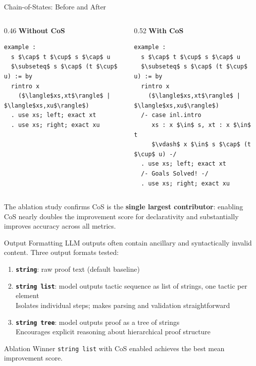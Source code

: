 \documentclass{beamer}
\begin{document}
\begin{frame}[fragile]{Chain-of-States: Before and After}
\begin{columns}[T]
\begin{column}{0.46\textwidth}
\textbf{Without CoS}
\begin{lstlisting}[basicstyle=\footnotesize\ttfamily]
example :
  s $\cap$ t $\cup$ s $\cap$ u
  $\subseteq$ s $\cap$ (t $\cup$ u) := by
  rintro x
    ($\langle$xs,xt$\rangle$ | $\langle$xs,xu$\rangle$)
  . use xs; left; exact xt
  . use xs; right; exact xu
\end{lstlisting}
\end{column}
\begin{column}{0.52\textwidth}
\textbf{With CoS}
\begin{lstlisting}[basicstyle=\footnotesize\ttfamily]
example :
  s $\cap$ t $\cup$ s $\cap$ u
  $\subseteq$ s $\cap$ (t $\cup$ u) := by
  rintro x
    ($\langle$xs,xt$\rangle$ | $\langle$xs,xu$\rangle$)
  /- case inl.intro
     xs : x $\in$ s, xt : x $\in$ t
     $\vdash$ x $\in$ s $\cap$ (t $\cup$ u) -/
  . use xs; left; exact xt
  /- Goals Solved! -/
  . use xs; right; exact xu
\end{lstlisting}
\end{column}
\end{columns}
\vspace{0.4em}
\small The ablation study confirms CoS is the \textbf{single largest contributor}: enabling CoS nearly doubles the improvement score for declarativity and substantially improves accuracy across all metrics.
\end{frame}

\begin{frame}{Output Formatting}
\vspace{0.3em}
LLM outputs often contain ancillary and syntactically invalid content. Three output formats tested:
\vspace{0.3em}
\begin{enumerate}\setlength{\itemsep}{7pt}
  \item \textbf{\texttt{string}}: raw proof text (default baseline)
  \item \textbf{\texttt{string list}}: model outputs tactic sequence as list of strings, one tactic per element\\
    \small Isolates individual steps; makes parsing and validation straightforward
  \item \textbf{\texttt{string tree}}: model outputs proof as a tree of strings\\
    \small Encourages explicit reasoning about hierarchical proof structure
\end{enumerate}
\vspace{0.3em}
\begin{block}{Ablation Winner}
  \texttt{string list} with CoS enabled achieves the best mean improvement score.
\end{block}
\end{frame}
\end{document}
